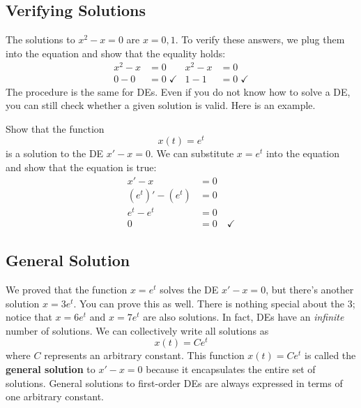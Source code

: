 \documentclass[letterpaper]{article}
\begin{document}
\subsection{Verifying Solutions}
The solutions to $x^2-x=0$ are $x=0,1$. To verify these answers, we plug them into the equation and show that the equality holds: 
\begin{align*}
    x^2 - x &=0   &  x^2-x&=0\\
    0-0&=0\; \checkmark   &   1-1&=0 \;\checkmark
\end{align*}
The procedure is the same for DEs. Even if you do not know how to solve a DE, you can still check whether a given solution is valid. Here is an example.

\begin{example}[1]{
Show that the function \[x(t)=e^{t}\] 
is a solution to the DE $x'-x=0$. 
}
We can substitute $x=e^{t}$ into the equation and show that the equation is true:
\begin{align*}
    x' - x &=0\\
    (e^t)'-(e^t)&=0\\
    e^t-e^t&=0\\
    0&=0 \quad \checkmark
\end{align*}
\end{example}

\subsection{General Solution}
We proved that the function $x=e^t$ solves the DE $x'-x=0$, but there's another solution $x=3e^{t}$. You can prove this as well.
There is nothing special about the $3$; notice that $x=6e^t$ and $x=7e^t$ are also solutions. In fact, DEs have an \textit{infinite} number of solutions. We can collectively write all solutions as \[x(t) = Ce^{t}\] 
where $C$ represents an arbitrary constant. This function $x(t)=Ce^{t}$ is called the \textbf{general solution} to $x'-x=0$ because it encapsulates the entire set of solutions. General solutions to first-order DEs are always expressed in terms of one arbitrary constant.

\end{document}
